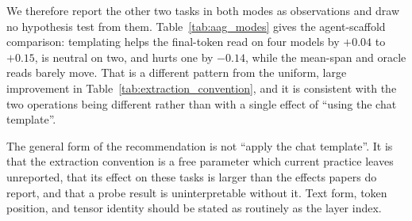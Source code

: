 We therefore report the other two tasks in both modes as observations and draw no hypothesis test from them.
Table~\ref{tab:aag_modes} gives the agent-scaffold comparison: templating helps the final-token read on four models
by $+0.04$ to $+0.15$, is neutral on two, and hurts one by $-0.14$, while the mean-span and oracle reads barely move.
That is a different pattern from the uniform, large improvement in Table~\ref{tab:extraction_convention}, and it is
consistent with the two operations being different rather than with a single effect of ``using the chat template''.



The general form of the recommendation is not ``apply the chat template''. It is that the extraction convention is a
free parameter which current practice leaves unreported, that its effect on these tasks is larger than the effects
papers do report, and that a probe result is uninterpretable without it. Text form, token position, and tensor
identity should be stated as routinely as the layer index.
